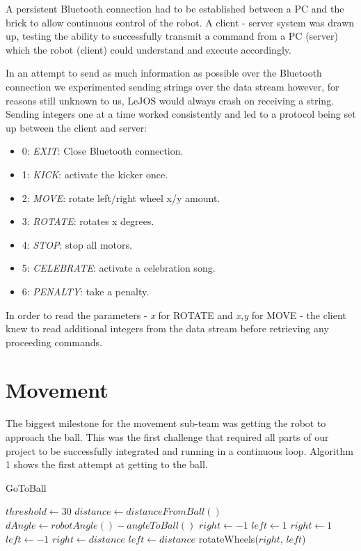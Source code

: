 \documentclass[conference,12pt]{IEEEtran}
\begin{document}
A persistent Bluetooth connection had to be established between a PC and the brick to allow continuous control of the robot. A client - server system was drawn up, testing the ability to successfully transmit a command from a PC (server) which the robot (client) could understand and execute accordingly.

In an attempt to send as much information as possible over the Bluetooth connection we experimented sending strings over the data stream however, for reasons still unknown to us, LeJOS would always crash on receiving a string. Sending integers one at a time worked consistently and led to a protocol being set up between the client and server:
\begin{itemize}
\item 0: \textit{EXIT}: Close Bluetooth connection.
\item 1: \textit{KICK}: activate the kicker once.
\item 2: \textit{MOVE}: rotate left/right wheel x/y amount.
\item 3: \textit{ROTATE}: rotates x degrees.
\item 4: \textit{STOP}: stop all motors.
\item 5: \textit{CELEBRATE}: activate a celebration song.
\item 6: \textit{PENALTY}: take a penalty.
\end{itemize}
In order to read the parameters - \textit{x} for ROTATE and \textit{x,y} for MOVE - the client knew to read additional integers from the data stream before retrieving any proceeding commands.

\section{Movement}
The biggest milestone for the movement sub-team was getting the robot to approach the ball. This was the first challenge that required all parts of our project to be successfully integrated and running in a continuous loop. Algorithm 1 shows the first attempt at getting to the ball.

\begin{algorithm}
\caption{GoToBall}
\begin{algorithmic}[1]
	\STATE $threshold\gets 30$
	\STATE $distance\gets distanceFromBall()$
	\STATE $dAngle\gets robotAngle() - angleToBall()$
		\STATE $right \gets -1$
		\STATE $left \gets 1$
	\ELSE
		\STATE $right \gets 1$
		\STATE $left \gets -1$
	\ENDIF
		\STATE $right \gets distance$
		\STATE $left \gets distance$
	\ENDIF
	\STATE rotateWheels($right$, $left$)
\ENDWHILE
\end{algorithmic}
\end{algorithm}
\end{document}
